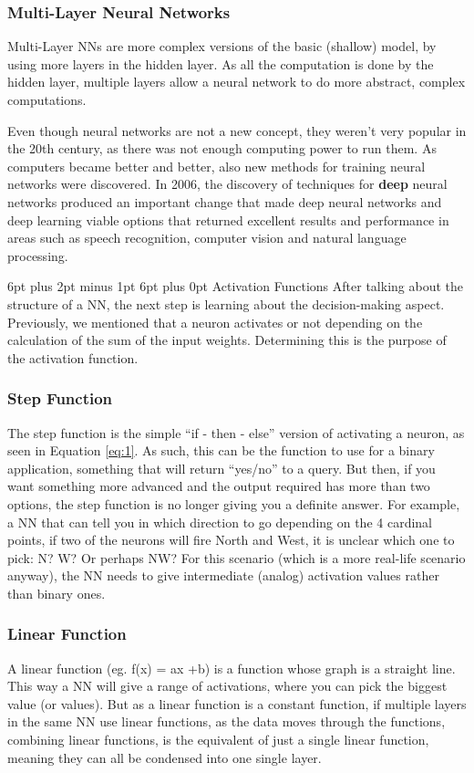 \documentclass[12pt,a4paper]{article}
\makeatletter
\renewcommand\subsection{\@startsection {subsection}{1}{2mm} %
                               {6pt plus 2pt minus 1pt} %
                               {6pt plus 0pt} %
                               {\normalfont\bfseries}}
\makeatother
\begin{document}
\subsubsection{Multi-Layer Neural Networks}
Multi-Layer NNs are more complex versions of the basic (shallow) model, by using more layers in the hidden layer. As all the computation is done by the hidden layer, multiple layers allow a neural network to do more abstract, complex computations.\par
Even though neural networks are not a new concept, they weren’t very popular in the 20th century, as there was not enough computing power to run them. As computers became better and better, also new methods for training neural networks were discovered. In 2006, the discovery of techniques for \textbf{deep} neural networks produced an important change that made deep neural networks and deep learning viable options that returned excellent results and performance in areas such as speech recognition, computer vision and natural language processing.  \cite{nielsenneural}

\subsection{Activation Functions}
After talking about the structure of a NN, the next step is learning about the decision-making aspect. Previously, we mentioned that a neuron activates or not depending on the calculation of the sum of the input weights. Determining this is the purpose of the activation function.\par
\subsubsection{Step Function}
The step function is the simple “if - then - else” version of activating a neuron, as seen in Equation \ref{eq:1}. As such, this can be the function to use for a binary application,  something that will return “yes/no” to a query. But then, if you want something more advanced and the output required has more than two options, the step function is no longer giving you a definite answer. For example, a NN that can tell you in which direction to go depending on the 4 cardinal points, if two of the neurons will fire North and West, it is unclear which one to pick: N? W? Or perhaps NW? For this scenario (which is a more real-life scenario anyway), the NN needs to give intermediate (analog) activation values rather than binary ones. \cite{sharma_understanding_2017}
\subsubsection{Linear Function}
A linear function (eg. f(x) = ax +b) is a function whose graph is a straight line. This way a NN will give a range of activations, where you can pick the biggest value (or values). But as a linear function is a constant function, if multiple layers in the same NN use linear functions, as the data moves through the functions, combining linear functions, is the equivalent of just a single linear function, meaning they can all be condensed into one single layer.
\end{document}
